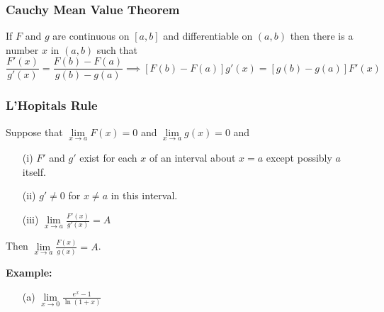 \documentclass{beamer}
\begin{document}
\begin{frame}
\frametitle{\textbf{Cauchy Mean Value Theorem}}

\begin{theorem}
	If $F$ and $g$ are continuous on $[a,b]$ and differentiable on $(a,b)$ then there is a number $x$ in $(a,b)$ such that
	$$\frac{F'(x)}{g'(x)} = \frac{F(b)-F(a)}{g(b)-g(a)} \implies [F(b)-F(a)]g'(x) = [g(b)-g(a)]F'(x)$$
\end{theorem}
\end{frame}


\begin{frame}
\frametitle{\textbf{L'Hopitals Rule}}
\begin{theorem}
	Suppose that $\lim\limits_{x \to a} F(x)=0$ and $\lim\limits_{x \to a} g(x)=0$ and
	\begin{itemize}
		\item[(i)] $F'$ and $g'$ exist for each $x$ of an interval about $x=a$ except possibly $a$ itself.
		\item[(ii)] $g'\neq0$ for $x\neq a$ in this interval.
		\item[(iii)] $\lim\limits_{x \to a} \frac{F'(x)}{g'(x)}=A$
	\end{itemize}
Then $\lim\limits_{x \to a} \frac{F(x)}{g(x)}=A$.
\end{theorem}
\textbf{Example:}
\begin{itemize}
	\item[(a)] $\lim\limits_{x\to 0} \frac{e^x-1}{\ln(1+x)}$
\end{itemize}
\end{frame}
\end{document}
